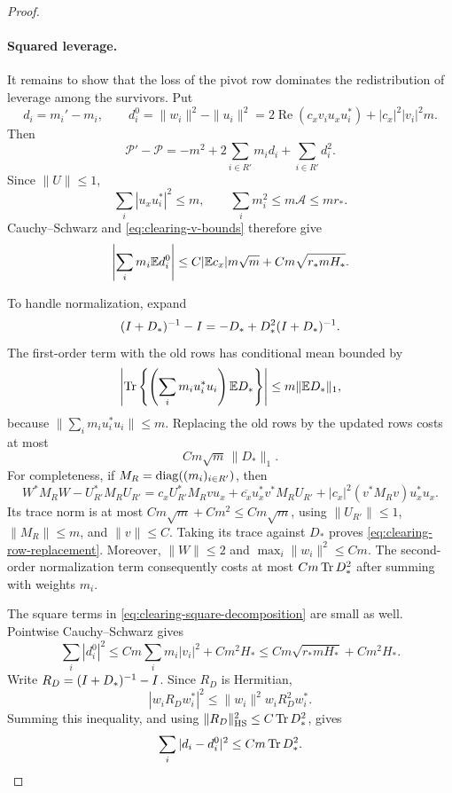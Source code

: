 \begin{proof}
\paragraph{Squared leverage.}
It remains to show that the loss of the pivot row dominates the
redistribution of leverage among the survivors.  Put
\[
 d_i=m_i'-m_i,\qquad
 d_i^0=\|w_i\|^2-\|u_i\|^2
      =2\operatorname{Re}(c_xv_iu_xu_i^*)
        +|c_x|^2|v_i|^2m.
\]
Then
\begin{equation}\label{eq:clearing-square-decomposition}
 \mathcal P'-\mathcal P
 =-m^2+2\sum_{i\in R'}m_id_i+\sum_{i\in R'}d_i^2.
\end{equation}
Since \(\|U\|\le1\),
\[
 \sum_i|u_xu_i^*|^2\le m,\qquad
 \sum_i m_i^2\le m\mathcal A\le mr_*.
\]
Cauchy--Schwarz and \eqref{eq:clearing-v-bounds} therefore give
\begin{equation}\label{eq:clearing-raw-mean}
 \left|\sum_i m_i\mathbb E d_i^0\right|
 \le C|\mathbb E c_x|m\sqrt m+Cm\sqrt{r_*mH_*}.
\end{equation}

To handle normalization, expand
\[
 (I+D_*)^{-1}-I
   =-D_*+D_*^2(I+D_*)^{-1}.
\]
The first-order term with the old rows has conditional mean bounded by
\[
 \left|\operatorname{Tr}\left\{\left(\sum_i m_iu_i^*u_i\right)
                    \mathbb E D_*\right\}\right|
 \le m\|\mathbb E D_*\|_1,
\]
because \(\|\sum_i m_iu_i^*u_i\|\le m\).
Replacing the old rows by the updated rows costs at most
\begin{equation}\label{eq:clearing-row-replacement}
 Cm\sqrt m\,\|D_*\|_1.
\end{equation}
For completeness, if \(M_R=\operatorname{diag}((m_i)_{i\in R'})\), then
\[
 W^*M_RW-U_{R'}^*M_RU_{R'}
 =c_xU_{R'}^*M_Rvu_x
  +\overline{c_x}u_x^*v^*M_RU_{R'}
  +|c_x|^2(v^*M_Rv)u_x^*u_x.
\]
Its trace norm is at most \(Cm\sqrt m+Cm^2\le Cm\sqrt m\),
using \(\|U_{R'}\|\le1\), \(\|M_R\|\le m\), and \(\|v\|\le C\).
Taking its trace against \(D_*\) proves
\eqref{eq:clearing-row-replacement}.
Moreover, \(\|W\|\le2\) and \(\max_i\|w_i\|^2\le Cm\).
The second-order normalization term consequently costs at most
\(Cm\operatorname{Tr} D_*^2\) after summing with weights \(m_i\).

The square terms in \eqref{eq:clearing-square-decomposition} are small
as well.  Pointwise Cauchy--Schwarz gives
\begin{equation}\label{eq:clearing-raw-squares}
 \sum_i|d_i^0|^2
 \le Cm\sum_i m_i|v_i|^2+Cm^2H_*
 \le Cm\sqrt{r_*mH_*}+Cm^2H_*.
\end{equation}
Write \(R_D=(I+D_*)^{-1}-I\).  Since \(R_D\) is Hermitian,
\[
 |w_iR_Dw_i^*|^2\le\|w_i\|^2w_iR_D^2w_i^*.
\]
Summing this inequality, and using
\(\|R_D\|_{\mathrm{HS}}^2\le C\operatorname{Tr} D_*^2\), gives
\begin{equation}\label{eq:clearing-normalization-squares}
 \sum_i|d_i-d_i^0|^2\le Cm\operatorname{Tr} D_*^2.
\end{equation}


\end{proof}
